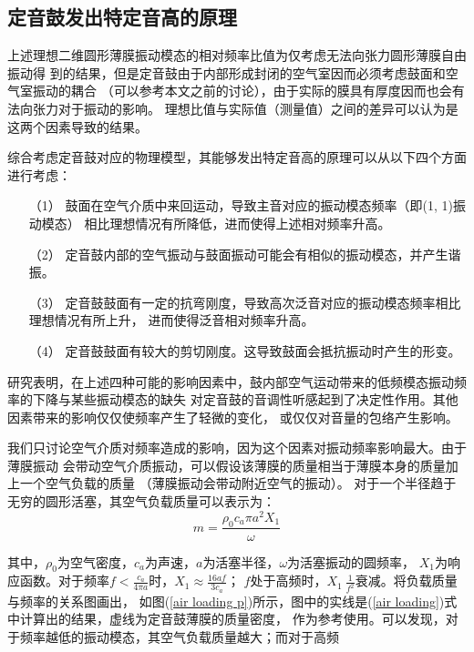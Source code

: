 \documentclass[a4paper]{ctexart}
\begin{document}
	\subsection{定音鼓发出特定音高的原理}
	\par 
	上述理想二维圆形薄膜振动模态的相对频率比值为仅考虑无法向张力圆形薄膜自由振动得
	到的结果，但是定音鼓由于内部形成封闭的空气室因而必须考虑鼓面和空气室振动的耦合
	（可以参考本文之前的讨论），由于实际的膜具有厚度因而也会有法向张力对于振动的影响。
	理想比值与实际值（测量值）之间的差异可以认为是这两个因素导致的结果。
	\par 
	综合考虑定音鼓对应的物理模型，其能够发出特定音高的原理可以从以下四个方面进行考虑\cite{a}：
	\begin{itemize}
		\item[（1）]
		鼓面在空气介质中来回运动，导致主音对应的振动模态频率（即(1, 1)振动模态）
		相比理想情况有所降低，进而使得上述相对频率升高。
		\item[（2）]
		定音鼓内部的空气振动与鼓面振动可能会有相似的振动模态，并产生谐振。
		\item[（3）]
		定音鼓鼓面有一定的抗弯刚度，导致高次泛音对应的振动模态频率相比理想情况有所上升，
		进而使得泛音相对频率升高。
		\item[（4）]
		定音鼓鼓面有较大的剪切刚度。这导致鼓面会抵抗振动时产生的形变。
	\end{itemize}
	\par 
	研究表明，在上述四种可能的影响因素中，鼓内部空气运动带来的低频模态振动频率的下降与某些振动模态的缺失
	对定音鼓的音调性听感起到了决定性作用。其他因素带来的影响仅仅使频率产生了轻微的变化，
	或仅仅对音量的包络产生影响。
	\par 
	我们只讨论空气介质对频率造成的影响，因为这个因素对振动频率影响最大。由于薄膜振动
	会带动空气介质振动，可以假设该薄膜的质量相当于薄膜本身的质量加上一个空气负载的质量
	（薄膜振动会带动附近空气的振动）。
	对于一个半径趋于无穷的圆形活塞，其空气负载质量可以表示为：
	\begin{equation}
		m = \frac{\rho_{0}c_{a}\pi a^{2}X_1}{\omega}
		\label{air loading}
	\end{equation}
	\par 
	其中，$\rho_0$为空气密度，$c_a$为声速，$a$为活塞半径，$\omega$为活塞振动的圆频率，
	$X_1$为响应函数。对于频率$f < \frac{c_{a}}{4\pi a}$时，$X_1\approx\frac{16af}{3c_a}$；
	$f$处于高频时，$X_{1}~\frac{1}{f^2}$衰减。将负载质量与频率的关系图画出，
	如图(\ref{air loading p})所示，图中的实线是(\ref{air loading})式中计算出的结果，虚线为定音鼓薄膜的质量密度，
	作为参考使用。可以发现，对于频率越低的振动模态，其空气负载质量越大；而对于高频
\end{document}
